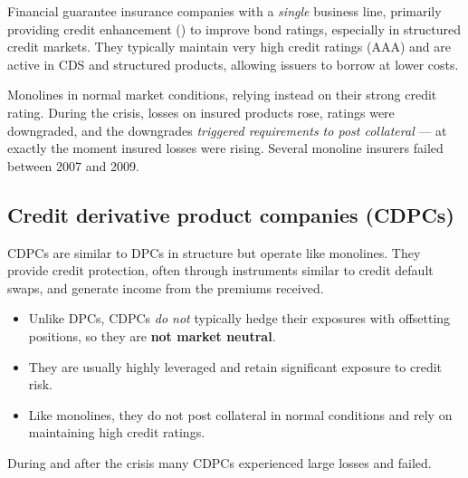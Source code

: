 Financial guarantee insurance companies with a \emph{single} business line,
primarily providing credit enhancement () to improve bond
ratings, especially in structured credit markets. They typically maintain very
high credit ratings (AAA) and are active in CDS and structured products, allowing
issuers to borrow at lower costs.

\begin{crtrapbox}
Monolines  in normal market conditions, relying
instead on their strong credit rating. During the crisis, losses on insured
products rose, ratings were downgraded, and the downgrades \emph{triggered
requirements to post collateral} --- at exactly the moment insured losses were
rising. Several monoline insurers failed between 2007 and 2009.
\end{crtrapbox}

\subsection*{Credit derivative product companies (CDPCs)}

CDPCs are similar to DPCs in structure but operate like monolines. They provide
credit protection, often through instruments similar to credit default swaps, and
generate income from the premiums received.

\begin{itemize}
\item Unlike DPCs, CDPCs \emph{do not} typically hedge their exposures with
offsetting positions, so they are \textbf{not market neutral}.
\item They are usually highly leveraged and retain significant exposure to credit
risk.
\item Like monolines, they do not post collateral in normal conditions and rely on
maintaining high credit ratings.
\end{itemize}

During and after the crisis many CDPCs experienced large losses and failed.


